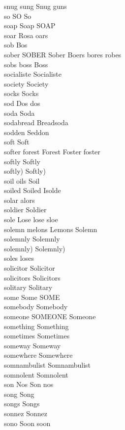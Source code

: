 snug sung Snug guns\\
so SO So\\
soap Soap SOAP\\
soar Rosa oars\\
sob Bos\\
sober SOBER Sober Boers bores robes\\
sobs boss Boss\\
socialiste Socialiste\\
society Society\\
socks Socks\\
sod Dos dos\\
soda Soda\\
sodabread Breadsoda\\
sodden Seddon\\
soft Soft\\
softer forest Forest Foster foster\\
softly Softly\\
softly) Softly)\\
soil oils Soil\\
soiled Soiled Isolde\\
solar alors\\
soldier Soldier\\
sole Lose lose sloe\\
solemn melons Lemons Solemn\\
solemnly Solemnly\\
solemnly) Solemnly)\\
soles loses\\
solicitor Solicitor\\
solicitors Solicitors\\
solitary Solitary\\
some Some SOME\\
somebody Somebody\\
someone SOMEONE Someone\\
something Something\\
sometimes Sometimes\\
someway Someway\\
somewhere Somewhere\\
somnambulist Somnambulist\\
somnolent Somnolent\\
son Nos Son nos\\
song Song\\
songs Songs\\
sonnez Sonnez\\
sono Soon soon\\

